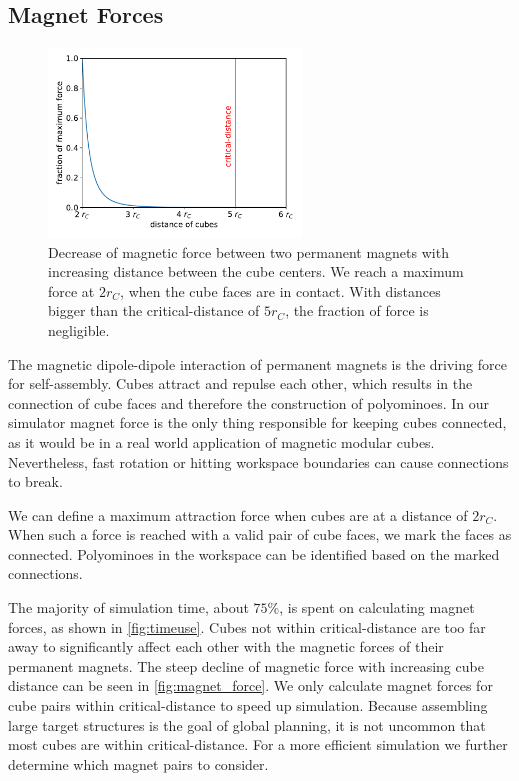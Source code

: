 \subsection{Magnet Forces}
\label{sec:force_magnet}

\begin{figure}
	\centering
	\includegraphics[width=0.6\textwidth]{figures/plots/magnet_force.pdf}
	\caption[Decrease of magnetic force with increasing cube distance]{Decrease of magnetic force between two permanent magnets with increasing distance between the cube centers. We reach a maximum force at $2 r_C$, when the cube faces are in contact. With distances bigger than the critical-distance of $5 r_C$, the fraction of force is negligible.}
	\label{fig:magnet_force}
\end{figure}

The magnetic dipole-dipole interaction of permanent magnets is the driving force for self-assembly.
Cubes attract and repulse each other, which results in the connection of cube faces and therefore the construction of polyominoes.
In our simulator magnet force is the only thing responsible for keeping cubes connected, as it would be in a real world application of magnetic modular cubes.
Nevertheless, fast rotation or hitting workspace boundaries can cause connections to break.

We can define a maximum attraction force when cubes are at a distance of $2 r_C$.
When such a force is reached with a valid pair of cube faces, we mark the faces as connected.
Polyominoes in the workspace can be identified based on the marked connections.

The majority of simulation time, about $75\%$, is spent on calculating magnet forces, as shown in \autoref{fig:timeuse}.
Cubes not within critical-distance are too far away to significantly affect each other with the magnetic forces of their permanent magnets.
The steep decline of magnetic force with increasing cube distance can be seen in \autoref{fig:magnet_force}.
We only calculate magnet forces for cube pairs within critical-distance to speed up simulation.
Because assembling large target structures is the goal of global planning, it is not uncommon that most cubes are within critical-distance.
For a more efficient simulation we further determine which magnet pairs to consider.


